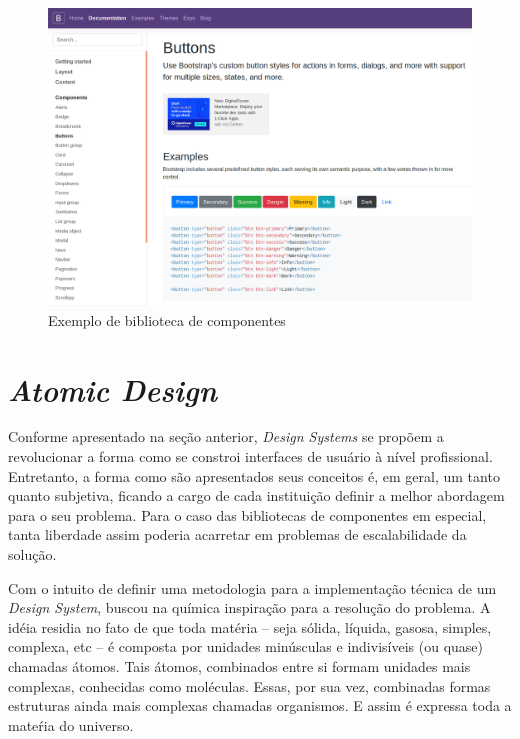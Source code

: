 \begin{figure}
	\includegraphics[width=\linewidth]{./04-figuras/02_referencial_teorico/bootstrap.png}
	\caption{Exemplo de biblioteca de componentes}
  \label{fig:bootstrapStyleGuide}
\end{figure}

\section{\textit{Atomic Design}}
\label{sec:atomicDesign}

Conforme apresentado na seção anterior, \textit{Design Systems} se propõem a revolucionar a forma como se constroi interfaces de usuário à nível profissional. Entretanto, a forma como são apresentados seus conceitos é, em geral, um tanto quanto subjetiva, ficando a cargo de cada instituição definir a melhor abordagem para o seu problema. Para o caso das bibliotecas de componentes em especial, tanta liberdade assim poderia acarretar em problemas de escalabilidade da solução.

Com o intuito de definir uma metodologia para a implementação técnica de um \textit{Design System}, \cite{frostAtomicDesign} buscou na química inspiração para a resolução do problema. A idéia residia no fato de que toda matéria -- seja sólida, líquida, gasosa, simples, complexa, etc -- é composta por unidades minúsculas e indivisíveis (ou quase) chamadas átomos. Tais átomos, combinados entre si formam unidades mais complexas, conhecidas como moléculas. Essas, por sua vez, combinadas formas estruturas ainda mais complexas chamadas organismos. E assim é expressa toda a mateŕia do universo.

